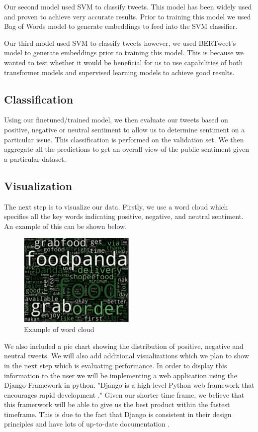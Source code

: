 \documentclass[conference]{IEEEtran}
\begin{document}
 



Our second model used SVM to classify tweets. This model has been widely used and proven to achieve very accurate results. Prior to training this model we used Bag of Words model to generate embeddings to feed into the SVM classifier.

Our third model used SVM to classify tweets however, we used BERTweet's model to generate embeddings prior to training this model. This is because we wanted to test whether it would be beneficial for us to use capabilities of both transformer models and supervised learning models to achieve good results.


\subsection{Classification}
Using our finetuned/trained model, we then evaluate our tweets based on positive, negative or neutral sentiment to allow us to determine sentiment on a particular issue. This classification is performed on the validation set.
We then aggregate all the predictions to get an overall view of the public sentiment given a particular dataset. 

\subsection{Visualization}
The next step is to visualize our data. 
Firstly, we use a word cloud which specifies all the key words indicating positive, negative, and neutral sentiment. 
An example of this can be shown below.

\begin{figure}[t]
    \includegraphics[width=0.5\textwidth]{wordcloud.png}
    \caption{Example of word cloud\cite{b2}}
\end{figure}

 We also included a pie chart showing the distribution of positive, negative and neutral tweets. 
 We will also add additional visualizations which we plan to show in the next step which is evaluating performance.
 In order to display this information to the user we will be implementing a web application using the Django Framework in python. 
 "Django is a high-level Python web framework that encourages rapid development \cite{b14}."
 Given our shorter time frame, we believe that this framerwork will be able to give us the best product within the fastest timeframe.
 This is due to the fact that Django is consistent in their design principles and have lots of up-to-date documentation \cite{b15}. 
\end{document}
